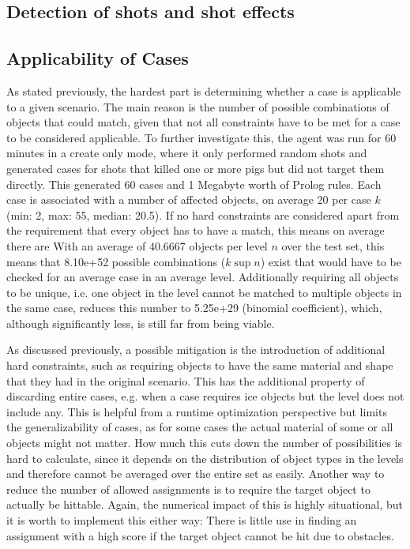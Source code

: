 \subsection{Detection of shots and shot effects}


\subsection{Applicability of Cases}\label{subsec:experimental-applicability}
As stated previously, the hardest part is determining whether a case is applicable to a given scenario.
The main reason is the number of possible combinations of objects that could match, given that not all constraints have to be met for a case to be considered applicable.
To further investigate this, the agent was run for 60 minutes in a create only mode, where it only performed random shots and generated cases for shots that killed one or more pigs but did not target them directly.
This generated 60 cases and 1 Megabyte worth of Prolog rules. Each case is associated with a number of affected objects, on average 20 per case $k$ (min: 2, max: 55, median: 20.5).
If no hard constraints are considered apart from the requirement that every object has to have a match, this means on average there are
With an average of 40.6667 objects per level $n$ over the test set, this means that
8.10e+52 possible combinations ($k\sup{n}$) exist that would have to be checked for an average case in an average level.
Additionally requiring all objects to be unique, i.e. one object in the level cannot be matched to multiple objects in the same case, reduces this number to
5.25e+29 (binomial coefficient), which, although significantly less, is still far from being viable.

As discussed previously, a possible mitigation is the introduction of additional hard constraints, such as requiring objects to have the same material and shape that they had in the original scenario.
This has the additional property of discarding entire cases, e.g. when a case requires ice objects but the level does not include any.
This is helpful from a runtime optimization perspective but limits the generalizability of cases, as for some cases the actual material of some or all objects might not matter.
How much this cuts down the number of possibilities is hard to calculate, since it depends on the distribution of object types in the levels and therefore cannot be averaged over the entire set as easily.
Another way to reduce the number of allowed assignments is to require the target object to actually be hittable.
Again, the numerical impact of this is highly situational, but it is worth to implement this either way:
There is little use in finding an assignment with a high score if the target object cannot be hit due to obstacles.

